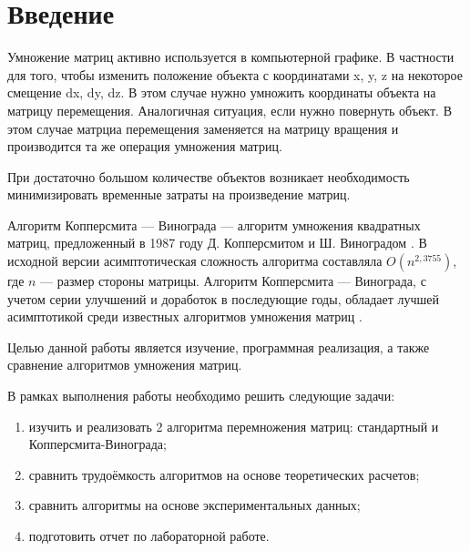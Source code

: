\chapter*{Введение}

Умножение матриц активно используется в компьютерной графике. В частности для того, чтобы изменить положение объекта с координатами x, y, z на некоторое смещение dx, dy, dz. В этом случае нужно умножить координаты объекта на матрицу перемещения. Аналогичная ситуация, если нужно повернуть объект. В этом случае матрциа перемещения заменяется на матрицу вращения и производится та же операция умножения матриц.   

При достаточно большом количестве объектов возникает необходимость минимизировать временные затраты на произведение матриц.

Алгоритм Копперсмита — Винограда — алгоритм умножения квадратных матриц, предложенный в 1987 году Д. Копперсмитом и Ш. Виноградом \cite{Coppersmith}.
В исходной версии асимптотическая сложность алгоритма составляла $O(n^{2,3755})$, где  $n$ — размер стороны матрицы.
Алгоритм Копперсмита — Винограда, с учетом серии улучшений и доработок в последующие годы, обладает лучшей асимптотикой среди известных алгоритмов умножения матриц \cite{Cohn}.

Целью данной работы является изучение, программная реализация, а также сравнение алгоритмов умножения матриц.


В рамках выполнения работы необходимо решить следующие задачи:

\begin{enumerate}
	\item изучить и реализовать 2 алгоритма перемножения матриц: стандартный и Копперсмита-Винограда;
	\item сравнить трудоёмкость алгоритмов на основе теоретических расчетов;
	\item сравнить алгоритмы на основе экспериментальных данных;
    \item подготовить отчет по лабораторной работе.
\end{enumerate}

